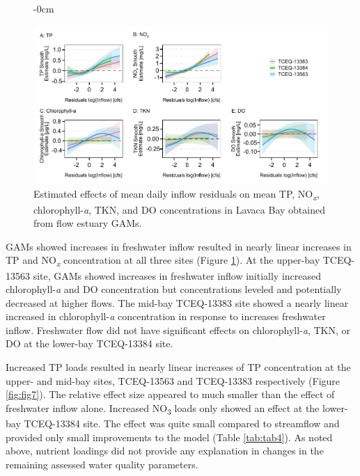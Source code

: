 \documentclass[water,article,submit,oneauthor]{Definitions/mdpi}
\begin{document}
\begin{figure}\begin{adjustwidth}{-\extralength}{0cm}

{\centering \includegraphics[width=1\linewidth]{Schramm-Manuscript-2023_files/figure-latex/fig6-1} 

}

\end{adjustwidth}\caption[Estimated effects of mean daily inflow residuals on mean TP, NO\textsubscript{\emph{x}}, chlorophyll-\emph{a}, TKN, and DO concentrations in Lavaca Bay obtained from flow estuary GAMs]{Estimated effects of mean daily inflow residuals on mean TP, NO\textsubscript{\emph{x}}, chlorophyll-\emph{a}, TKN, and DO concentrations in Lavaca Bay obtained from flow estuary GAMs.}\label{fig:fig6}
\end{figure}

GAMs showed increases in freshwater inflow resulted in nearly linear
increases in TP and NO\textsubscript{\emph{x}} concentration at all
three sites (Figure \ref{fig:fig6}). At the upper-bay TCEQ-13563 site,
GAMs showed increases in freshwater inflow initially increased
chlorophyll-\emph{a} and DO concentration but concentrations leveled and
potentially decreased at higher flows. The mid-bay TCEQ-13383 site
showed a nearly linear increased in chlorophyll-\emph{a} concentration
in response to increases freshwater inflow. Freshwater flow did not have
significant effects on chlorophyll-\emph{a}, TKN, or DO at the lower-bay
TCEQ-13384 site.

Increased TP loads resulted in nearly linear increases of TP
concentration at the upper- and mid-bay sites, TCEQ-13563 and TCEQ-13383
respectively (Figure \ref{fig:fig7}). The relative effect size appeared
to much smaller than the effect of freshwater inflow alone. Increased
NO\textsubscript{3} loads only showed an effect at the lower-bay
TCEQ-13384 site. The effect was quite small compared to streamflow and
provided only small improvements to the model (Table \ref{tab:tab4}). As
noted above, nutrient loadings did not provide any explanation in
changes in the remaining assessed water quality parameters.
\end{document}
